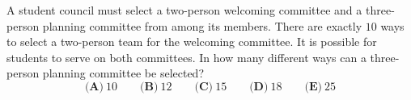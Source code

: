 A student council must select a two-person welcoming committee and a three-person planning committee from among its members. There are exactly $10$ ways to select a two-person team for the welcoming committee. It is possible for students to serve on both committees. In how many different ways can a three-person planning committee be selected?
\[\textbf{(A)}\ 10\qquad\textbf{(B)}\ 12\qquad\textbf{(C)}\ 15\qquad\textbf{(D)}\ 18\qquad\textbf{(E)}\ 25\]

